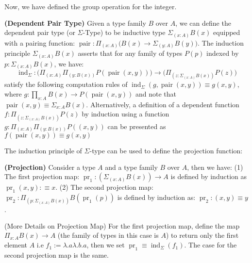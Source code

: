 Now, we have defined the group operation for the integer. 

\begin{definition}{\textbf{(Dependent Pair Type)}}
    Given a type family $B$ over $A$, we can define the dependent pair type (or $\Sigma$-Type) to be inductive type $\Sigma_{(x:A)}B(x)$ equipped with a pairing function: $\operatorname{pair}: \Pi_{(x:A)}\big(B(x)\rightarrow \Sigma_{(y:A)}B(y)\big)$. The induction principle $\Sigma_{(x:A)}B(x)$ asserts that for any family of types $P(p)$ indexed by $p:\Sigma_{(x:A)}B(x)$, we have:
    \begin{equation*}
        \operatorname{ind}_\Sigma : \Big(\Pi_{(x:A)}\Pi_{(y:B(x))}P(\operatorname{pair}(x, y))\Big) \rightarrow \Big(\Pi_{(z:\Sigma_{(x:A)}B(x))}P(z)\Big)
    \end{equation*}
    satisfy the following computation rules of $\operatorname{ind}_\Sigma(g, \operatorname{pair}(x,y))\equiv g(x, y)$, where $g:\prod_{x:A}B(x)\to P(\operatorname{pair}(x, y))$ and note that $\operatorname{pair}(x, y)\equiv\Sigma_{x:A}B(x)$. Alternatively, a definition of a dependent function $f:\Pi_{(z:\Sigma_{(x:A)}B(x))}P(z)$ by induction using a function $g:\Pi_{(x:A)}\Pi_{(y:B(x))}P((x,y))$ can be presented as $f(\operatorname{pair}(x,y)) \equiv g(x,y)$
\end{definition}

The induction principle of $\Sigma$-type can be used to define the projection function:
\begin{definition}{\textbf{(Projection)}}
    Consider a type $A$ and a type family $B$ over $A$, then we have: (1) The first projection map: $\operatorname{pr}_1:(\Sigma_{(x:A)}B(x))\rightarrow A$ is defined by induction as $\operatorname{pr}_1(x,y):\equiv x$. (2) The second projection map: $\operatorname{pr}_2:\Pi_{(p:\Sigma_{(x:A)}B(x))}B(\operatorname{pr}_1(p))$ is defined by induction as: $\operatorname{pr}_2:(x,y)\equiv y$.
\end{definition}

\begin{remark}{(More Details on Projection Map)}
    For the first projection map, define the map $\Pi_{x:A}B(x)\to A$ (the family of types in this case is $A$) to return only the first element $A$ i.e $f_1:=\lambda.a\lambda.b.a$, then we set $\operatorname{pr}_1\equiv\operatorname{ind}_\Sigma(f_1)$. The case for the second projection map is the same.
\end{remark}

